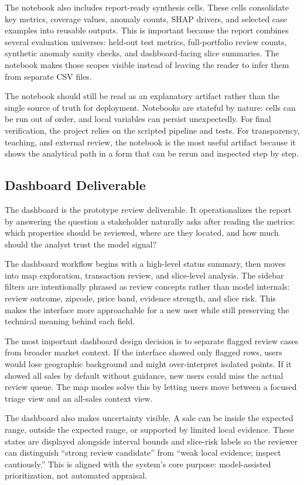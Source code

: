 \documentclass[12pt,a4paper]{article}
\begin{document}
The notebook also includes report-ready synthesis cells. These cells consolidate key metrics, coverage values, anomaly counts, SHAP drivers, and selected case examples into reusable outputs. This is important because the report combines several evaluation universes: held-out test metrics, full-portfolio review counts, synthetic anomaly sanity checks, and dashboard-facing slice summaries. The notebook makes those scopes visible instead of leaving the reader to infer them from separate CSV files.

The notebook should still be read as an explanatory artifact rather than the single source of truth for deployment. Notebooks are stateful by nature: cells can be run out of order, and local variables can persist unexpectedly. For final verification, the project relies on the scripted pipeline and tests. For transparency, teaching, and external review, the notebook is the most useful artifact because it shows the analytical path in a form that can be rerun and inspected step by step.

\subsection{Dashboard Deliverable}
The dashboard  is the prototype review deliverable. It operationalizes the report by answering the question a stakeholder naturally asks after reading the metrics: which properties should be reviewed, where are they located, and how much should the analyst trust the model signal?

The dashboard workflow begins with a high-level status summary, then moves into map exploration, transaction review, and slice-level analysis. The sidebar filters are intentionally phrased as review concepts rather than model internals: review outcome, zipcode, price band, evidence strength, and slice risk. This makes the interface more approachable for a new user while still preserving the technical meaning behind each field.

The most important dashboard design decision is to separate flagged review cases from broader market context. If the interface showed only flagged rows, users would lose geographic background and might over-interpret isolated points. If it showed all sales by default without guidance, new users could miss the actual review queue. The map modes solve this by letting users move between a focused triage view and an all-sales context view.

The dashboard also makes uncertainty visible. A sale can be inside the expected range, outside the expected range, or supported by limited local evidence. These states are displayed alongside interval bounds and slice-risk labels so the reviewer can distinguish ``strong review candidate'' from ``weak local evidence; inspect cautiously.'' This is aligned with the system's core purpose: model-assisted prioritization, not automated appraisal.
\end{document}
